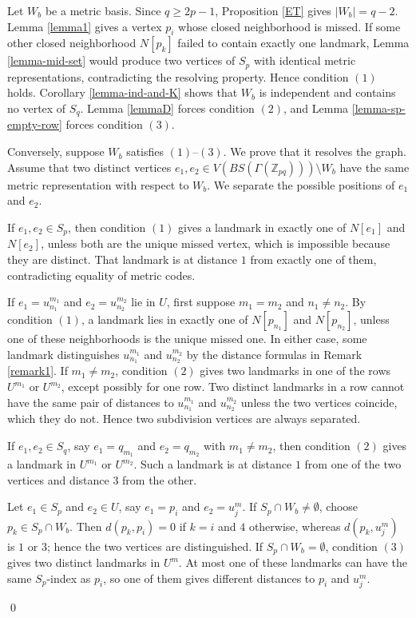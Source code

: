 \documentclass[12pt]{article}
\renewenvironment{proof}{{\bf \noindent Proof.}}{\qed}
\begin{document}
\begin{proof}
Let $W_b$ be a metric basis. Since $q\geq 2p-1$, Proposition \ref{ET} gives $|W_b|=q-2$. Lemma \ref{lemma1} gives a vertex $p_i$ whose closed neighborhood is missed. If some other closed neighborhood $N[p_k]$ failed to contain exactly one landmark, Lemma \ref{lemma-mid-set} would produce two vertices of $S_p$ with identical metric representations, contradicting the resolving property. Hence condition $\mathrm{(1)}$ holds. Corollary \ref{lemma-ind-and-K} shows that $W_b$ is independent and contains no vertex of $S_q$. Lemma \ref{lemmaD} forces condition $\mathrm{(2)}$, and Lemma \ref{lemma-sp-empty-row} forces condition $\mathrm{(3)}$.

Conversely, suppose $W_b$ satisfies $\mathrm{(1)}$--$\mathrm{(3)}$. We prove that it resolves the graph. Assume that two distinct vertices $e_1,e_2\in V(BS(\Gamma(\mathbb Z_{pq})))\setminus W_b$ have the same metric representation with respect to $W_b$. We separate the possible positions of $e_1$ and $e_2$.

If $e_1,e_2\in S_p$, then condition $\mathrm{(1)}$ gives a landmark in exactly one of $N[e_1]$ and $N[e_2]$, unless both are the unique missed vertex, which is impossible because they are distinct. That landmark is at distance $1$ from exactly one of them, contradicting equality of metric codes.

If $e_1=u_{n_1}^{m_1}$ and $e_2=u_{n_2}^{m_2}$ lie in $U$, first suppose $m_1=m_2$ and $n_1\neq n_2$. By condition $\mathrm{(1)}$, a landmark lies in exactly one of $N[p_{n_1}]$ and $N[p_{n_2}]$, unless one of these neighborhoods is the unique missed one. In either case, some landmark distinguishes $u_{n_1}^{m_1}$ and $u_{n_2}^{m_2}$ by the distance formulas in Remark \ref{remark1}. If $m_1\neq m_2$, condition $\mathrm{(2)}$ gives two landmarks in one of the rows $U^{m_1}$ or $U^{m_2}$, except possibly for one row. Two distinct landmarks in a row cannot have the same pair of distances to $u_{n_1}^{m_1}$ and $u_{n_2}^{m_2}$ unless the two vertices coincide, which they do not. Hence two subdivision vertices are always separated.

If $e_1,e_2\in S_q$, say $e_1=q_{m_1}$ and $e_2=q_{m_2}$ with $m_1\neq m_2$, then condition $\mathrm{(2)}$ gives a landmark in $U^{m_1}$ or $U^{m_2}$. Such a landmark is at distance $1$ from one of the two vertices and distance $3$ from the other.

Let $e_1\in S_p$ and $e_2\in U$, say $e_1=p_i$ and $e_2=u_j^m$. If $S_p\cap W_b\neq\emptyset$, choose $p_k\in S_p\cap W_b$. Then $d(p_k,p_i)=0$ if $k=i$ and $4$ otherwise, whereas $d(p_k,u_j^m)$ is $1$ or $3$; hence the two vertices are distinguished. If $S_p\cap W_b=\emptyset$, condition $\mathrm{(3)}$ gives two distinct landmarks in $U^m$. At most one of these landmarks can have the same $S_p$-index as $p_i$, so one of them gives different distances to $p_i$ and $u_j^m$.


\end{proof}
\end{document}
